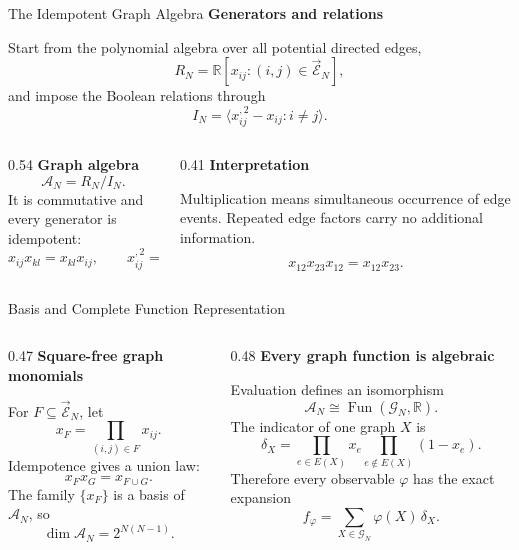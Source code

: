 \documentclass[11pt]{beamer}
\newcommand{\eyebrow}[1]{%
  {\color{accent}\bfseries #1}\par
  \vspace{0.04cm}{\color{lightgray}\rule{\linewidth}{0.45pt}}\vspace{0.10cm}}
\newcommand{\keyterm}[1]{\textcolor{accent}{\bfseries #1}}
\begin{document}
\begin{frame}{The Idempotent Graph Algebra}
  \small
  \eyebrow{Generators and relations}

  Start from the polynomial algebra over all potential directed edges,
  \[
    R_N=\mathbb R[x_{ij}:(i,j)\in\overrightarrow{\mathcal E}_N],
  \]
  and impose the Boolean relations through
  \[
    I_N=\big\langle x_{ij}^{,2}-x_{ij}:i\neq j\big\rangle.
  \]

  \vspace{0.12cm}
  \begin{columns}[T,onlytextwidth]
    \begin{column}{0.54\textwidth}
      \keyterm{Graph algebra}
      \[
        \mathcal A_N=R_N/I_N.
      \]
      It is commutative and every generator is idempotent:
      \[
        x_{ij}x_{kl}=x_{kl}x_{ij},
        \qquad x_{ij}^{,2}=x_{ij}.
      \]
    \end{column}
    \begin{column}{0.41\textwidth}
      \keyterm{Interpretation}\par
      Multiplication means simultaneous occurrence of edge events. Repeated edge factors carry no additional information.

      \vspace{0.32cm}
      \[
        x_{12}x_{23}x_{12}=x_{12}x_{23}.
      \]
    \end{column}
  \end{columns}
\end{frame}

\begin{frame}{Basis and Complete Function Representation}
  \small
  \begin{columns}[T,onlytextwidth]
    \begin{column}{0.47\textwidth}
      \eyebrow{Square-free graph monomials}
      For $F\subseteq\overrightarrow{\mathcal E}_N$, let
      \[
        x_F=\prod_{(i,j)\in F}x_{ij}.
      \]
      Idempotence gives a union law:
      \[
        x_Fx_G=x_{F\cup G}.
      \]
      The family $\{x_F\}$ is a basis of $\mathcal A_N$, so
      \[
        \dim\mathcal A_N=2^{N(N-1)}.
      \]
    \end{column}
    \begin{column}{0.48\textwidth}
      \eyebrow{Every graph function is algebraic}
      Evaluation defines an isomorphism
      \[
        \mathcal A_N\cong\operatorname{Fun}(\mathcal G_N,\mathbb R).
      \]
      The indicator of one graph $X$ is
      \[
        \delta_X=
        \prod_{e\in E(X)}x_e
        \prod_{e\notin E(X)}(1-x_e).
      \]
      Therefore every observable $\varphi$ has the exact expansion
      \[
        f_\varphi=\sum_{X\in\mathcal G_N}\varphi(X)\,\delta_X.
      \]
    \end{column}
  \end{columns}
\end{frame}
\end{document}
